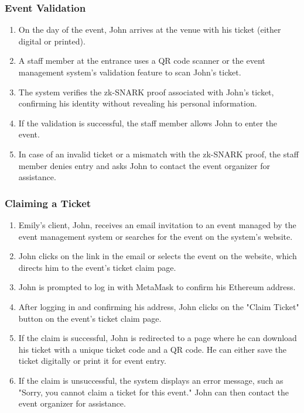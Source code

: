 \subsubsection{Event Validation}
\begin{enumerate}
\item On the day of the event, John arrives at the venue with his ticket (either digital or printed).
\item A staff member at the entrance uses a QR code scanner or the event management system's validation feature to scan John's ticket.
\item The system verifies the zk-SNARK proof associated with John's ticket, confirming his identity without revealing his personal information.
\item If the validation is successful, the staff member allows John to enter the event.
\item In case of an invalid ticket or a mismatch with the zk-SNARK proof, the staff member denies entry and asks John to contact the event organizer for assistance.
\end{enumerate}

\subsubsection{Claiming a Ticket}
\begin{enumerate}
\item Emily's client, John, receives an email invitation to an event managed by the event management system or searches for the event on the system's website.
\item John clicks on the link in the email or selects the event on the website, which directs him to the event's ticket claim page.
\item John is prompted to log in with MetaMask to confirm his Ethereum address.
\item After logging in and confirming his address, John clicks on the "Claim Ticket" button on the event's ticket claim page.
\item If the claim is successful, John is redirected to a page where he can download his ticket with a unique ticket code and a QR code. He can either save the ticket digitally or print it for event entry.
\item If the claim is unsuccessful, the system displays an error message, such as "Sorry, you cannot claim a ticket for this event." John can then contact the event organizer for assistance.
\end{enumerate}


